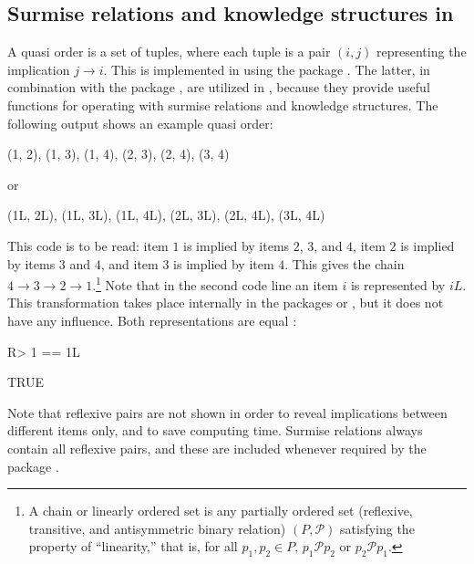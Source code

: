 \documentclass[nojss]{jss}
\begin{document}
\subsection[Surmise relations and knowledge structures in DAKS]{Surmise relations and knowledge structures in } 
\label{subsec:sr}

A quasi order is a set of tuples, where each tuple is a pair $(i,j)$ representing the implication $j \rightarrow i$. This is implemented in  using the package  \citep{sets}. The latter, in combination with the package  \citep{rel}, are utilized in , because they provide useful functions for operating with surmise relations and knowledge structures. The following  output shows an example quasi order:
\begin{Code}
{(1, 2), (1, 3), (1, 4), (2, 3), (2, 4), (3, 4)}
\end{Code}
or
\begin{Code}
{(1L, 2L), (1L, 3L), (1L, 4L), (2L, 3L), (2L, 4L), (3L, 4L)}
\end{Code}
This code is to be read: item $1$ is implied by items $2$, $3$, and $4$, item $2$ is implied by items $3$ and $4$, and item $3$ is implied by item $4$. 
This gives the chain $4 \rightarrow 3  \rightarrow2  \rightarrow 1$.\footnote{\label{footnote:chain}A
chain or linearly ordered set is any partially ordered set (reflexive, transitive, and antisymmetric 
binary relation) $(P,\mathcal{P})$ satisfying the property of ``linearity,'' that is, 
for all $p_1,p_2\in P$, $p_1\mathcal{P}p_2$ or $p_2\mathcal{P}p_1$.} 
Note that in the second code line an item $i$ is represented by $iL$. This transformation 
takes place internally in the packages  or , but it does not have any influence. 
Both representations are equal \citep[see pp.\ 306--307 in][for how  parses numeric constants]{R:10}:
\begin{Schunk}
\begin{Sinput}
R> 1 == 1L
\end{Sinput}
\begin{Soutput}
[1] TRUE
\end{Soutput}
\end{Schunk}

Note that reflexive pairs are not shown in order to reveal implications between different items only, and to save computing time. 
Surmise relations always contain all reflexive pairs, and these are included whenever required by the package .  
\end{document}
